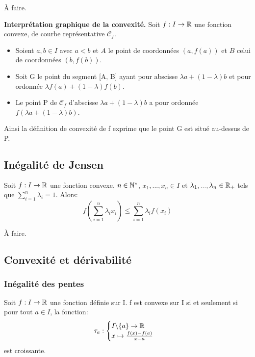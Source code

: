 \documentclass[a4paper, 12pt]{article}
\begin{document}
\begin{demonstration}
    À faire.
\end{demonstration}

\textbf{Interprétation graphique de la convexité.}
Soit $f: I \rightarrow \mathbb{R}$ une fonction convexe, de courbe représentative $\mathscr{C}_f$.

\begin{itemize}
    \item Soient $a, b \in I$ avec $a \lt b$ et $A$ le point de coordonnées $(a, f(a))$ et $B$ celui de coordonnées $(b, f(b))$.
    \item Soit G le point du segment [A, B] ayant pour abscisse $\lambda a + (1 - \lambda)b$ et pour ordonnée $\lambda f(a) + (1 - \lambda)f(b)$.
    \item Le point P de $\mathscr{C}_f$ d'abscisse $\lambda a + (1 - \lambda)b$ a pour ordonnée $f(\lambda a + (1 - \lambda)b)$.
\end{itemize}

Ainsi la définition de convexité de f exprime que le point G est situé au-dessus de P.


\subsection{Inégalité de Jensen}

\begin{proposition}
    Soit $f: I \rightarrow \mathbb{R}$ une fonction convexe, $n \in \mathbb{N}^*$, $x_1, ..., x_n \in I$ et $\lambda_1, ..., \lambda_n \in \mathbb{R}_+$ tels que $\sum_{i=1}^{n}\lambda_i = 1$.
    Alors:
    $$
    f(\sum_{i=1}^{n}\lambda_ix_i) \leq \sum_{i=1}^{n}\lambda_if(x_i)
    $$
\end{proposition}

\begin{demonstration}
    À faire.
\end{demonstration}

\subsection{Convexité et dérivabilité}

\subsubsection{Inégalité des pentes}

\begin{proposition}
    Soit $f: I \rightarrow \mathbb{R}$ une fonction définie sur I. f est convexe sur I si et seulement si pour tout $a \in I$, la fonction:
    $$
    \tau_a : \begin{cases} I\backslash\{a\} \rightarrow \mathbb{R} \\ x \mapsto \frac{f(x)-f(a)}{x - a} \end{cases}
    $$
    est croissante.
\end{proposition}
\end{document}

